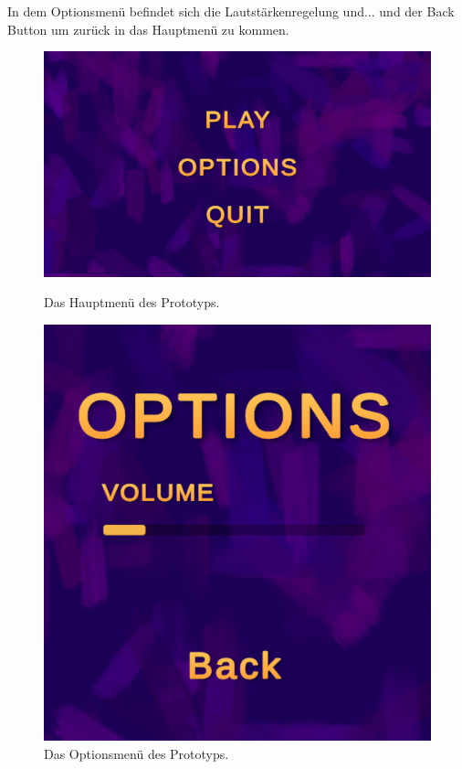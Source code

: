 In dem Optionsmenü befindet sich die Lautstärkenregelung und... und der Back Button um zurück in das Hauptmenü zu kommen.
    


\begin{figure}[H]
    \centering
    \begin{minipage}{0.4\textwidth}
        \centering
        \includegraphics[width=\linewidth]{chapters/03/images/MainMenu.png}
        \caption{Das Hauptmenü des Prototyps.}
        \label{htl02a}
    \end{minipage}%
    \hspace{1cm}%
    \begin{minipage}{0.4\textwidth}
        \centering
        \includegraphics[width=\linewidth]{chapters/03/images/OptionsMainMenu.png}
        \caption{Das Optionsmenü des Prototyps.}
        \label{htl02b}
    \end{minipage}
\end{figure}



